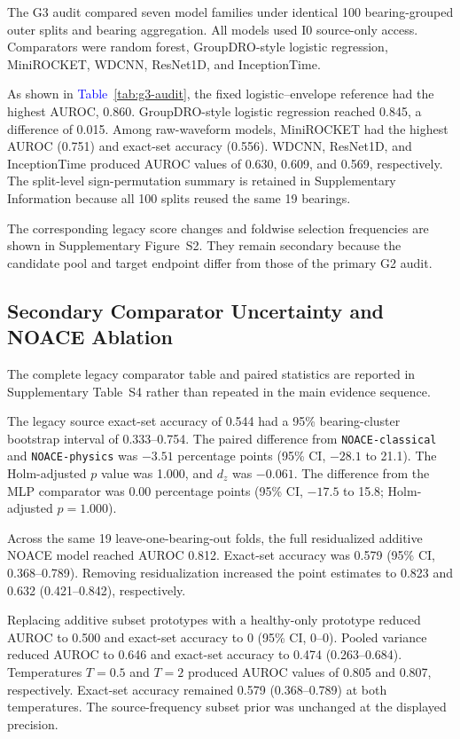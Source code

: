 \documentclass[machines,article,submit,oneauthor,pdftex]{Definitions/mdpi}
\newcommand{\tbl}[1]{\textcolor{blue}{Table~#1}}
\begin{document}
The G3 audit compared seven model families under identical 100 bearing-grouped outer splits and bearing aggregation. All models used I0 source-only access. Comparators were random forest, GroupDRO-style logistic regression, MiniROCKET, WDCNN, ResNet1D, and InceptionTime.



As shown in \tbl{\ref{tab:g3-audit}}, the fixed logistic--envelope reference had the highest AUROC, 0.860. GroupDRO-style logistic regression reached 0.845, a difference of 0.015. Among raw-waveform models, MiniROCKET had the highest AUROC (0.751) and exact-set accuracy (0.556). WDCNN, ResNet1D, and InceptionTime produced AUROC values of 0.630, 0.609, and 0.569, respectively. The split-level sign-permutation summary is retained in Supplementary Information because all 100 splits reused the same 19 bearings.

The corresponding legacy score changes and foldwise selection frequencies are shown in Supplementary Figure~S2. They remain secondary because the candidate pool and target endpoint differ from those of the primary G2 audit.

\subsection{Secondary Comparator Uncertainty and NOACE Ablation}

The complete legacy comparator table and paired statistics are reported in Supplementary Table~S4 rather than repeated in the main evidence sequence.

The legacy source exact-set accuracy of 0.544 had a 95\% bearing-cluster bootstrap interval of 0.333--0.754. The paired difference from \texttt{NOACE-classical} and \texttt{NOACE-physics} was $-3.51$ percentage points (95\% CI, $-28.1$ to 21.1). The Holm-adjusted $p$ value was 1.000, and $d_z$ was $-0.061$. The difference from the MLP comparator was 0.00 percentage points (95\% CI, $-17.5$ to 15.8; Holm-adjusted $p=1.000$).

Across the same 19 leave-one-bearing-out folds, the full residualized additive NOACE model reached AUROC 0.812. Exact-set accuracy was 0.579 (95\% CI, 0.368--0.789). Removing residualization increased the point estimates to 0.823 and 0.632 (0.421--0.842), respectively.

Replacing additive subset prototypes with a healthy-only prototype reduced AUROC to 0.500 and exact-set accuracy to 0 (95\% CI, 0--0). Pooled variance reduced AUROC to 0.646 and exact-set accuracy to 0.474 (0.263--0.684). Temperatures $T=0.5$ and $T=2$ produced AUROC values of 0.805 and 0.807, respectively. Exact-set accuracy remained 0.579 (0.368--0.789) at both temperatures. The source-frequency subset prior was unchanged at the displayed precision.
\end{document}
